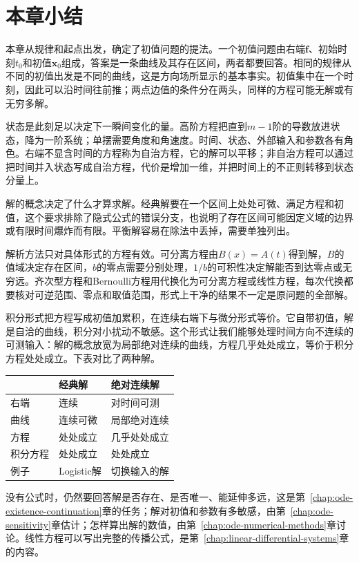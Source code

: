 \section{本章小结}
\label{sec:ivp-summary}

本章从规律和起点出发，确定了初值问题的提法。一个初值问题由右端$\bm{f}$、初始时刻$t_0$和初值$\bm{x}_0$组成，答案是一条曲线及其存在区间，两者都要回答。相同的规律从不同的初值出发是不同的曲线，这是方向场所显示的基本事实。初值集中在一个时刻，因此可以沿时间往前推；两点边值的条件分在两头，同样的方程可能无解或有无穷多解。

状态是此刻足以决定下一瞬间变化的量。高阶方程把直到$m-1$阶的导数放进状态，降为一阶系统；单摆需要角度和角速度。时间、状态、外部输入和参数各有角色。右端不显含时间的方程称为自治方程，它的解可以平移；非自治方程可以通过把时间并入状态写成自治方程，代价是增加一维，并把时间上的不正则转移到状态分量上。

解的概念决定了什么才算求解。经典解要在一个区间上处处可微、满足方程和初值，这个要求排除了隐式公式的错误分支，也说明了存在区间可能因定义域的边界或有限时间爆炸而有限。平衡解容易在除法中丢掉，需要单独列出。

解析方法只对具体形式的方程有效。可分离方程由$B(x)=A(t)$得到解，$B$的值域决定存在区间，$b$的零点需要分别处理，$1/b$的可积性决定解能否到达零点或无穷远。齐次型方程和Bernoulli方程用代换化为可分离方程或线性方程，每次代换都要核对可逆范围、零点和取值范围，形式上干净的结果不一定是原问题的全部解。

积分形式把方程写成初值加累积，在连续右端下与微分形式等价。它自带初值，解是自洽的曲线，积分对小扰动不敏感。这个形式让我们能够处理时间方向不连续的可测输入：解的概念放宽为局部绝对连续的曲线，方程几乎处处成立，等价于积分方程处处成立。下表对比了两种解。

\begin{BookInlineTable}
 \centering
 \caption{经典解与绝对连续解}
 \label{tab:ivp-solution-comparison}
 \begin{tabular}{lll}
 \toprule
 & 经典解 & 绝对连续解 \\
 \midrule
 右端 & 连续 & 对时间可测 \\
 曲线 & 连续可微 & 局部绝对连续 \\
 方程 & 处处成立 & 几乎处处成立 \\
 积分方程 & 处处成立 & 处处成立 \\
 例子 & Logistic解 & 切换输入的解 \\
 \bottomrule
 \end{tabular}
\end{BookInlineTable}

没有公式时，仍然要回答解是否存在、是否唯一、能延伸多远，这是第~\ref{chap:ode-existence-continuation}章的任务；解对初值和参数有多敏感，由第~\ref{chap:ode-sensitivity}章估计；怎样算出解的数值，由第~\ref{chap:ode-numerical-methods}章讨论。线性方程可以写出完整的传播公式，是第~\ref{chap:linear-differential-systems}章的内容。
